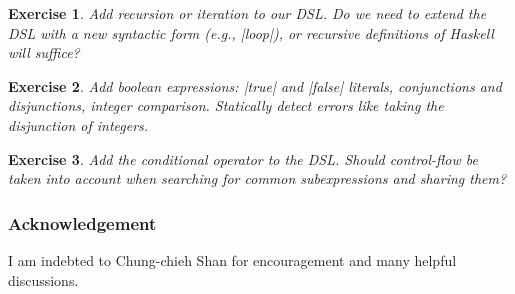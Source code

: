 \documentclass[submission,copyright,creativecommons]{eptcs}
\newtheorem{Exercise}{Exercise} \newcommand\aside[1]{}
\begin{document}
\begin{Exercise}
Add recursion or iteration to our DSL. Do we need to extend the DSL
with a new syntactic form (e.g., |loop|), or recursive definitions of
Haskell will suffice?
\end{Exercise}

\begin{Exercise}
Add boolean expressions: |true| and |false| literals, conjunctions and
disjunctions, integer comparison. Statically detect errors like taking
the disjunction of integers.
\end{Exercise}

\begin{Exercise}
Add the conditional operator to the DSL. Should control-flow be taken
into account when searching for common subexpressions and sharing them?
\end{Exercise}

\subsubsection*{Acknowledgement}
I am indebted to Chung-chieh Shan for encouragement and many helpful
discussions.





\nocite{*}


\end{document}
